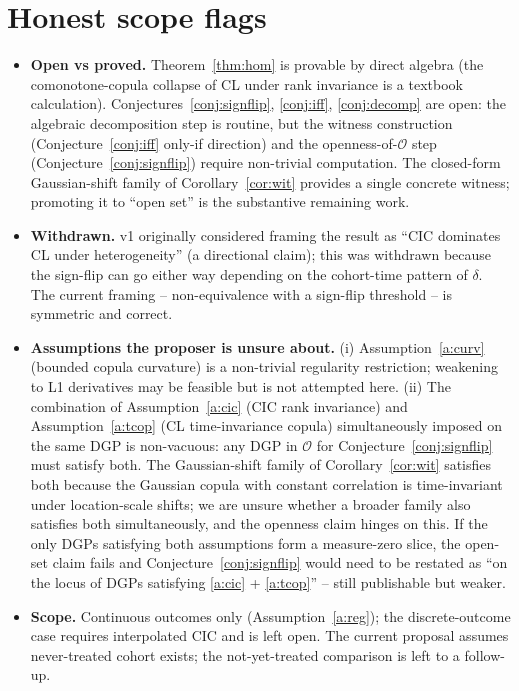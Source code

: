 \documentclass[11pt]{article}
\theoremstyle{definition}
\theoremstyle{plain}
\theoremstyle{remark}
\begin{document}
\section{Honest scope flags}
\begin{itemize}[leftmargin=*,itemsep=2pt,topsep=2pt]
  \item \textbf{Open vs proved.} Theorem~\ref{thm:hom} is provable by direct algebra (the comonotone-copula collapse of CL under rank invariance is a textbook calculation). Conjectures~\ref{conj:signflip}, \ref{conj:iff}, \ref{conj:decomp} are open: the algebraic decomposition step is routine, but the witness construction (Conjecture~\ref{conj:iff} only-if direction) and the openness-of-$\mathcal{O}$ step (Conjecture~\ref{conj:signflip}) require non-trivial computation. The closed-form Gaussian-shift family of Corollary~\ref{cor:wit} provides a single concrete witness; promoting it to ``open set'' is the substantive remaining work.
  \item \textbf{Withdrawn.} v1 originally considered framing the result as ``CIC dominates CL under heterogeneity'' (a directional claim); this was withdrawn because the sign-flip can go either way depending on the cohort-time pattern of $\delta$. The current framing -- non-equivalence with a sign-flip threshold -- is symmetric and correct.
  \item \textbf{Assumptions the proposer is unsure about.} (i) Assumption~\ref{a:curv} (bounded copula curvature) is a non-trivial regularity restriction; weakening to L1 derivatives may be feasible but is not attempted here. (ii) The combination of Assumption~\ref{a:cic} (CIC rank invariance) and Assumption~\ref{a:tcop} (CL time-invariance copula) simultaneously imposed on the same DGP is non-vacuous: any DGP in $\mathcal{O}$ for Conjecture~\ref{conj:signflip} must satisfy both. The Gaussian-shift family of Corollary~\ref{cor:wit} satisfies both because the Gaussian copula with constant correlation is time-invariant under location-scale shifts; we are unsure whether a broader family also satisfies both simultaneously, and the openness claim hinges on this. If the only DGPs satisfying both assumptions form a measure-zero slice, the open-set claim fails and Conjecture~\ref{conj:signflip} would need to be restated as ``on the locus of DGPs satisfying \ref{a:cic} + \ref{a:tcop}'' -- still publishable but weaker.
  \item \textbf{Scope.} Continuous outcomes only (Assumption~\ref{a:reg}); the discrete-outcome case requires interpolated CIC \cite{AtheyImbens2006} and is left open. The current proposal assumes never-treated cohort exists; the not-yet-treated comparison is left to a follow-up.
\end{itemize}
\end{document}
